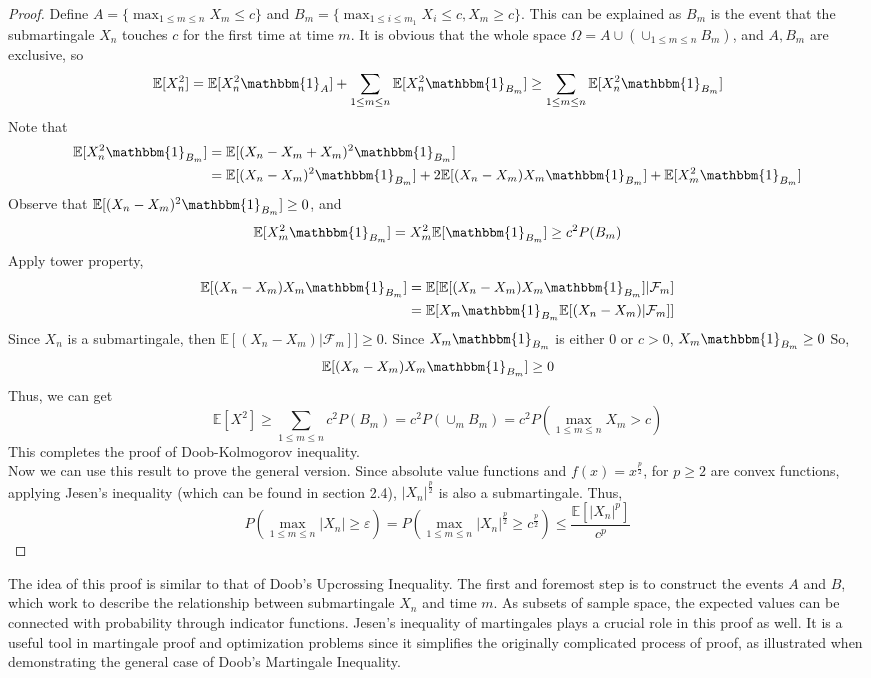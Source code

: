 \documentclass[10pt]{article}
\begin{document}
\begin{proof}
Define $A=\{\max_{1 \le m \le n}X_m \le c\}$ and $B_m=\{\max_{1 \le i \le m_1}X_i\le c, X_m \ge c\}$.  This can be explained as $B_m$ is the event that the submartingale $X_n$ touches $c$ for the first time at time $m$. It is obvious that the whole space $\Omega=A \cup (\cup_{1\le m \le n} B_m)$, and $A, B_m$ are exclusive, so 
$$\mathbb{E}[X_n^2]=\mathbb{E}[X_n^2 \mathbbm{1}_A]+\sum_{1\le m \le n}\mathbb{E}[X_n^2 \mathbbm{1}_{B_m}]\ge \sum_{1\le m \le n}\mathbb{E}[X_n^2 \mathbbm{1}_{B_m}]$$
Note that \begin{align*}
    \mathbb{E}[X_n^2\mathbbm{1}_{B_m}]&=\mathbb{E}[(X_n-X_m+X_m)^2\mathbbm{1}_{B_m}]\\&=\mathbb{E}[(X_n-X_m)^2\mathbbm{1}_{B_m}]+2\mathbb{E}[(X_n-X_m)X_m\mathbbm{1}_{B_m}]+\mathbb{E}[X_m^2\mathbbm{1}_{B_m}]
\end{align*}
Observe that 
$\mathbb{E}[(X_n-X_m)^2\mathbbm{1}_{B_m}]\ge 0$, and  
$$\mathbb{E}[X_m^2\mathbbm{1}_{B_m}]= X_m^2 \mathbb{E}[\mathbbm{1}_{B_m}]\ge c^2P(B_m)$$ Apply tower property, \begin{align*}
    \mathbb{E}[(X_n-X_m)X_m\mathbbm{1}_{B_m}]&=\mathbb{E}[\mathbb{E}[(X_n-X_m)X_m\mathbbm{1}_{B_m}]|\mathcal{F}_m]\\&=\mathbb{E}[X_m \mathbbm{1}_{B_m}\mathbb{E}[(X_n-X_m)|\mathcal{F}_m]]
\end{align*}
Since $X_n$ is a submartingale, then $\mathbb{E}[(X_n-X_m)|\mathcal{F}_m]]\ge 0$. Since $X_m \mathbbm{1}_{B_m}$ is either 0 or $c>0$, $X_m \mathbbm{1}_{B_m} \ge 0$
So, $$\mathbb{E}[(X_n-X_m)X_m\mathbbm{1}_{B_m}]\ge 0$$
Thus, we can get $$\mathbb{E}[X^2]\ge \sum_{1 \le m \le n}c^2P(B_m)=c^2P(\cup_{m}B_m)=c^2P(\max_{1 \le m \le n}X_m>c)$$ This completes the proof of Doob-Kolmogorov inequality.\\
Now we can use this result to prove the general version. Since  absolute value functions and $f(x)=x^{\frac{p}{2}}$, for $p \ge 2$ are convex functions, applying Jesen's inequality (which can be found in section 2.4), $|X_n|^{\frac{p}{2}}$ is also a submartingale. Thus, $$P(\max_{1 \le m\le n}|X_n|\ge \varepsilon)=P(\max_{1\le m \le n}|X_n|^{\frac{p}{2}}\ge c^{\frac{p}{2}})\le \frac{\mathbb{E}[|X_n|^p]}{c^p}$$
\end{proof}
The idea of this proof is similar to that of Doob's Upcrossing Inequality. The first and foremost step is to construct the events $A$ and $B$, which work to describe the relationship between submartingale $X_n$ and time $m$. As subsets of sample space, the expected values can be connected with probability through indicator functions. Jesen's inequality of martingales plays a crucial role in this proof as well. It is a useful tool in martingale proof and optimization problems since it simplifies the originally complicated process of proof, as illustrated when demonstrating the general case of Doob's Martingale Inequality.
\end{document}

